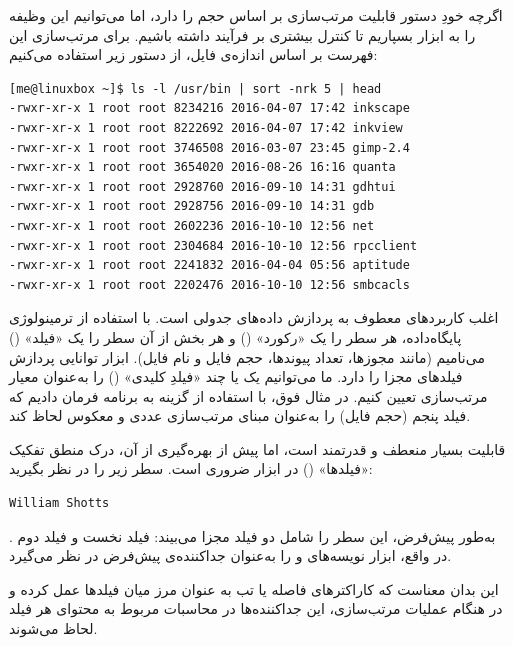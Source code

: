 اگرچه خودِ دستور  قابلیت مرتب‌سازی بر اساس حجم را دارد، اما می‌توانیم این وظیفه را به ابزار  بسپاریم تا کنترل بیشتری بر فرآیند داشته باشیم. برای مرتب‌سازی این فهرست بر اساس اندازه‌ی فایل، از دستور زیر استفاده می‌کنیم:

\begin{latin}
\begin{lstlisting}
[me@linuxbox ~]$ ls -l /usr/bin | sort -nrk 5 | head
-rwxr-xr-x 1 root root 8234216 2016-04-07 17:42 inkscape
-rwxr-xr-x 1 root root 8222692 2016-04-07 17:42 inkview
-rwxr-xr-x 1 root root 3746508 2016-03-07 23:45 gimp-2.4
-rwxr-xr-x 1 root root 3654020 2016-08-26 16:16 quanta
-rwxr-xr-x 1 root root 2928760 2016-09-10 14:31 gdhtui
-rwxr-xr-x 1 root root 2928756 2016-09-10 14:31 gdb
-rwxr-xr-x 1 root root 2602236 2016-10-10 12:56 net
-rwxr-xr-x 1 root root 2304684 2016-10-10 12:56 rpcclient
-rwxr-xr-x 1 root root 2241832 2016-04-04 05:56 aptitude
-rwxr-xr-x 1 root root 2202476 2016-10-10 12:56 smbcacls
\end{lstlisting}
\end{latin}

اغلب کاربردهای  معطوف به پردازش داده‌های جدولی است. با استفاده از ترمینولوژی پایگاه‌داده، هر سطر را یک «رکورد» () و هر بخش از آن سطر را یک «فیلد» () می‌نامیم (مانند مجوزها، تعداد پیوندها، حجم فایل و نام فایل). ابزار  توانایی پردازش فیلدهای مجزا را دارد. ما می‌توانیم یک یا چند «فیلدِ کلیدی» () را به‌عنوان معیار مرتب‌سازی تعیین کنیم. در مثال فوق، با استفاده از گزینه  به برنامه فرمان دادیم که فیلد پنجم (حجم فایل) را به‌عنوان مبنای مرتب‌سازی عددی و معکوس لحاظ کند.

قابلیت  بسیار منعطف و قدرتمند است، اما پیش از بهره‌گیری از آن، درک منطق تفکیک «فیلدها» () در ابزار  ضروری است. سطر زیر را در نظر بگیرید:

\begin{latin}
\begin{lstlisting}
William Shotts
\end{lstlisting}
\end{latin}

به‌طور پیش‌فرض،  این سطر را شامل دو فیلد مجزا می‌بیند: فیلد نخست  و فیلد دوم . در واقع، ابزار  نویسه‌های  و  را به‌عنوان جداکننده‌ی پیش‌فرض در نظر می‌گیرد.

این بدان معناست که کاراکترهای فاصله یا تب به عنوان مرز میان فیلدها عمل کرده و در هنگام عملیات مرتب‌سازی، این جداکننده‌ها در محاسبات مربوط به محتوای هر فیلد لحاظ می‌شوند.

